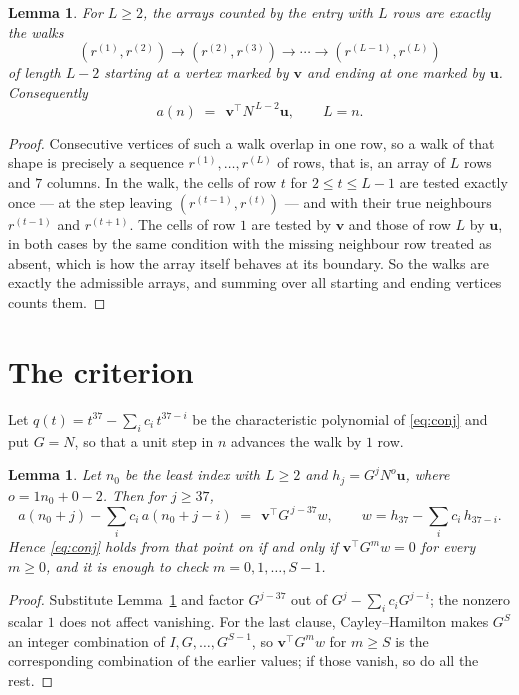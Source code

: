 \documentclass[11pt,a4paper]{article}
\theoremstyle{plain}
\newtheorem{lemma}[theorem]{Lemma}
\theoremstyle{definition}
\begin{document}
\begin{lemma}\label{lem:walk}
For $L\ge2$, the arrays counted by the entry with $L$ rows are exactly the walks
\[
(r^{(1)},r^{(2)})\to(r^{(2)},r^{(3)})\to\cdots\to(r^{(L-1)},r^{(L)})
\]
of length $L-2$ starting at a vertex marked by $\mathbf{v}$ and ending at one marked by
$\mathbf{u}$. Consequently
\[
a(n)\;=\;\,\mathbf{v}^{\!\top}N^{\,L-2}\mathbf{u},\qquad L=n .
\]
\end{lemma}

\begin{proof}
Consecutive vertices of such a walk overlap in one row, so a walk of that shape is
precisely a sequence $r^{(1)},\dots,r^{(L)}$ of rows, that is, an array of $L$ rows
and $7$ columns. In the walk, the cells of row $t$ for $2\le t\le L-1$ are tested
exactly once --- at the step leaving $(r^{(t-1)},r^{(t)})$ --- and with their true
neighbours $r^{(t-1)}$ and $r^{(t+1)}$. The cells of row $1$ are tested by
$\mathbf{v}$ and those of row $L$ by $\mathbf{u}$, in both cases by the same condition
with the missing neighbour row treated as absent, which is how the array itself behaves at
its boundary. So the walks are exactly the admissible arrays, and summing over all starting
and ending vertices counts them.
\end{proof}

\section{The criterion}

Let $q(t)=t^{37}-\sum_i c_i\,t^{37-i}$ be the characteristic polynomial of
\eqref{eq:conj} and put $G=N$, so that a unit step in $n$ advances the walk by
$1$ row.

\begin{lemma}\label{lem:crit}
Let $n_0$ be the least index with $L\ge2$ and $h_j=G^{j}N^{o}\mathbf{u}$, where
$o=1n_0+0-2$. Then for $j\ge37$,
\[
a(n_0+j)-\sum_i c_i\,a(n_0+j-i)\;=\;\,\mathbf{v}^{\!\top}G^{\,j-37}w,
\qquad w=h_{37}-\sum_i c_i\,h_{37-i} .
\]
Hence \eqref{eq:conj} holds from that point on if and only if
$\mathbf{v}^{\!\top}G^{m}w=0$ for every $m\ge0$, and it is enough to check
$m=0,1,\dots,S-1$.
\end{lemma}

\begin{proof}
Substitute Lemma~\ref{lem:walk} and factor $G^{j-37}$ out of
$G^{j}-\sum_ic_iG^{j-i}$; the nonzero scalar $1$ does not affect
vanishing. For the last clause, Cayley--Hamilton makes $G^{S}$ an integer combination of
$I,G,\dots,G^{S-1}$, so $\mathbf{v}^{\!\top}G^{m}w$ for $m\ge S$ is the corresponding
combination of the earlier values; if those vanish, so do all the rest.
\end{proof}
\end{document}
